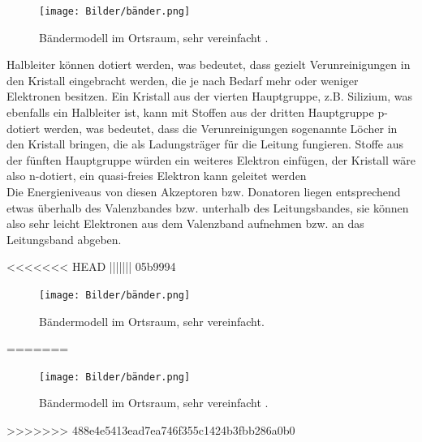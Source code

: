 \begin{figure}[H]
    \centering
    \texttt{[image: Bilder/bänder.png]}
    \caption{Bändermodell im Ortsraum, sehr vereinfacht \cite{magnesium}.}
    \label{fig:bänder}
\end{figure}

Halbleiter können dotiert werden, was bedeutet, dass gezielt Verunreinigungen in den Kristall eingebracht werden, die je nach Bedarf mehr oder weniger Elektronen besitzen.
Ein Kristall aus der vierten Hauptgruppe, z.B. Silizium, was ebenfalls ein Halbleiter ist, kann mit Stoffen aus der dritten Hauptgruppe p-dotiert werden, was bedeutet, dass die Verunreinigungen sogenannte Löcher
in den Kristall bringen, die als Ladungsträger für die Leitung fungieren. Stoffe aus der fünften Hauptgruppe würden ein weiteres Elektron einfügen, der Kristall wäre also n-dotiert, ein quasi-freies Elektron kann geleitet werden\\
Die Energieniveaus von diesen Akzeptoren bzw. Donatoren liegen entsprechend etwas überhalb des Valenzbandes bzw. unterhalb des Leitungsbandes, sie können also sehr leicht Elektronen aus dem Valenzband aufnehmen bzw. an das Leitungsband abgeben.

<<<<<<< HEAD
||||||| 05b9994
\begin{figure}[H]
    \centering
    \texttt{[image: Bilder/bänder.png]}
    \caption{Bändermodell im Ortsraum, sehr vereinfacht. \cite{magnesium}}
    \label{fig:bänder}
\end{figure}
=======
\begin{figure}[H]
    \centering
    \texttt{[image: Bilder/bänder.png]}
    \caption{Bändermodell im Ortsraum, sehr vereinfacht \cite{magnesium}.}
    \label{fig:bänder}
\end{figure}
>>>>>>> 488e4e5413ead7ea746f355c1424b3fbb286a0b0


